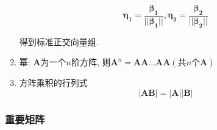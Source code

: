 \begin{enumerate}
    \begin{equation*}
    	\bm{\eta_{1}}=\frac{\bm{\beta_{1}}}{||\bm{\beta_{1}}||}, \bm{\eta_{2}}=\frac{\bm{\beta_{2}}}{||\bm{\beta_{2}}||}
    \end{equation*}\par
    得到标准正交向量组.
    \item 幂: $ \bm{A} $为一个$ n $阶方阵, 则$ \bm{A}^{n}=\bm{A}\bm{A}...\bm{A}\bm{A}(\text{共}n\text{个}\bm{A}) $
    \item 方阵乘积的行列式
    \begin{equation*}
    	|\bm{A}\bm{B}|=|\bm{A}||\bm{B}|
    \end{equation*}
\end{enumerate}
\subsubsection{重要矩阵}
